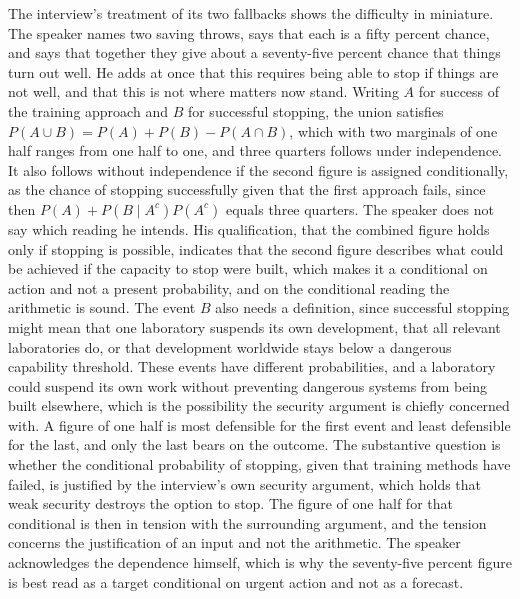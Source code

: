 \documentclass[11pt]{article}
\begin{document}
The interview's treatment of its two fallbacks shows the difficulty in miniature. The speaker names two saving throws, says that each is a fifty percent chance, and says that together they give about a seventy-five percent chance that things turn out well. He adds at once that this requires being able to stop if things are not well, and that this is not where matters now stand. Writing $A$ for success of the training approach and $B$ for successful stopping, the union satisfies $P(A\cup B)=P(A)+P(B)-P(A\cap B)$, which with two marginals of one half ranges from one half to one, and three quarters follows under independence. It also follows without independence if the second figure is assigned conditionally, as the chance of stopping successfully given that the first approach fails, since then $P(A)+P(B\mid A^{c})P(A^{c})$ equals three quarters. The speaker does not say which reading he intends. His qualification, that the combined figure holds only if stopping is possible, indicates that the second figure describes what could be achieved if the capacity to stop were built, which makes it a conditional on action and not a present probability, and on the conditional reading the arithmetic is sound. The event $B$ also needs a definition, since successful stopping might mean that one laboratory suspends its own development, that all relevant laboratories do, or that development worldwide stays below a dangerous capability threshold. These events have different probabilities, and a laboratory could suspend its own work without preventing dangerous systems from being built elsewhere, which is the possibility the security argument is chiefly concerned with. A figure of one half is most defensible for the first event and least defensible for the last, and only the last bears on the outcome. The substantive question is whether the conditional probability of stopping, given that training methods have failed, is justified by the interview's own security argument, which holds that weak security destroys the option to stop. The figure of one half for that conditional is then in tension with the surrounding argument, and the tension concerns the justification of an input and not the arithmetic. The speaker acknowledges the dependence himself, which is why the seventy-five percent figure is best read as a target conditional on urgent action and not as a forecast.
\end{document}
